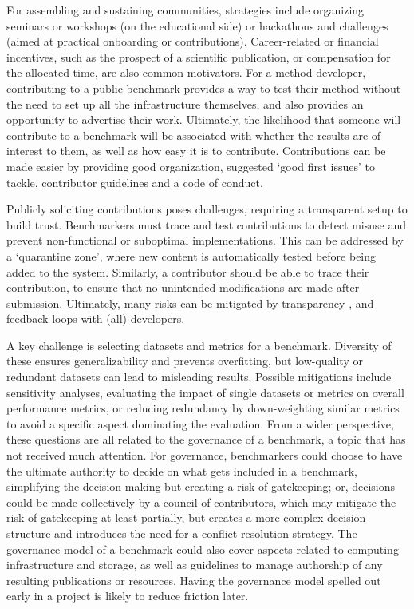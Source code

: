 \documentclass[11pt]{article}
\begin{document}
For assembling and sustaining communities, strategies include organizing seminars or workshops (on the educational side) or  hackathons and challenges (aimed at practical onboarding or contributions). Career-related or financial incentives, such as the prospect of a scientific publication, or compensation for the allocated time, are also common motivators. For a method developer, contributing to a public benchmark provides a way to test their method without the need to set up all the infrastructure themselves, and also provides an opportunity to advertise their work. Ultimately, the likelihood that someone will contribute to a benchmark will be associated with whether the results are of interest to them, as well as how easy it is to contribute. Contributions can be made easier by providing good organization, suggested `good first issues' to tackle, contributor guidelines and a code of conduct.

Publicly soliciting contributions poses challenges, requiring a transparent setup to build trust. Benchmarkers must trace and test contributions to detect misuse and prevent non-functional or suboptimal implementations. This can be addressed by a `quarantine zone', where new content is automatically tested before being added to the system. Similarly, a contributor should be able to trace their contribution, to ensure that no unintended modifications are made after submission. Ultimately, many risks can be mitigated by transparency \cite{Greenstein2016-os}, and feedback loops with (all) developers.

A key challenge is selecting datasets and metrics for a benchmark. Diversity of these ensures generalizability and prevents overfitting, but low-quality or redundant datasets can lead to misleading results. Possible mitigations include sensitivity analyses, evaluating the impact of single datasets or metrics on overall performance metrics, or reducing redundancy by down-weighting similar metrics to avoid a specific aspect dominating the evaluation. From a wider perspective, these questions are all related to the governance of a benchmark, a topic that has not received much attention. For governance, benchmarkers could choose to have the ultimate authority to decide on what gets included in a benchmark, simplifying the decision making but creating a risk of gatekeeping; or, decisions could be made collectively by a council of contributors, which may mitigate the risk of gatekeeping at least partially, but creates a more complex decision structure and introduces the need for a conflict resolution strategy. The governance model of a benchmark could also cover aspects related to computing infrastructure and storage, as well as guidelines to manage authorship of any resulting publications or resources. Having the governance model spelled out early in a project is likely to reduce friction later.
\end{document}

